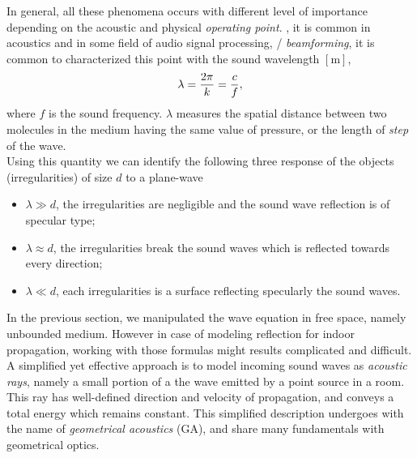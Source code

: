In general, all these phenomena occurs with different level of importance depending on the acoustic and physical
\textit{operating point}.
, it is common in acoustics and in some field of audio signal processing, \ie/
\textit{beamforming}, it is common to characterized this point with the sound wavelength $[\si{\metre}]$,
\begin{equation}
    \lambda = \frac{2 \pi}{k} = \frac{c}{f}
    ,
\end{equation}
where $f$ is the sound frequency.
$\lambda$ measures the spatial distance between two molecules in the medium having the same value of pressure, or
the length of \emph{step} of the wave.
\\Using this quantity we can identify the following three response of the objects (irregularities) of size $d$ to a plane-wave
\begin{itemize}
    \item $\lambda \gg d$, the irregularities are negligible and the sound wave reflection is of specular type;
    \item $\lambda \approx d$, the irregularities break the sound waves which is reflected towards every direction;
    \item $\lambda \ll d$, each irregularities is a surface reflecting specularly the sound waves.
\end{itemize}


In the previous section, we manipulated the wave equation in free space, namely unbounded medium.
However in case of modeling reflection for indoor propagation, working with those formulas might results complicated and difficult.
A simplified yet effective approach is to model incoming sound waves as \textit{acoustic rays}, namely
a small portion of a the wave emitted by a point source in a room.
This ray has well-defined direction and velocity of propagation, and conveys a total energy which remains constant.
This simplified description undergoes with the name of \textit{geometrical acoustics} (GA), and share many fundamentals with geometrical optics.


